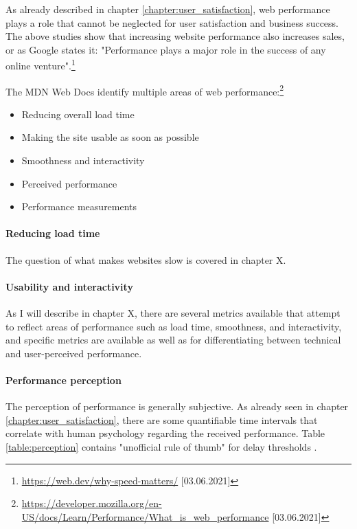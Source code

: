 As already described in chapter \ref{chapter:user_satisfaction}, web performance plays a role that cannot be neglected for user satisfaction and business success.
The above studies show that increasing website performance also increases sales, or as Google states it: "Performance plays a major role in the success of any online venture".\footnote{\url{https://web.dev/why-speed-matters/} [03.06.2021]}

The MDN Web Docs identify multiple areas of web performance:\footnote{\url{https://developer.mozilla.org/en-US/docs/Learn/Performance/What_is_web_performance} [03.06.2021]}
\begin{itemize}
\item Reducing overall load time
\item Making the site usable as soon as possible
\item Smoothness and interactivity
\item Perceived performance
\item Performance measurements
\end{itemize}

\paragraph{Reducing load time}

The question of what makes websites slow is covered in chapter X.


\paragraph{Usability and interactivity}

As I will describe in chapter X, there are several metrics available that attempt to reflect areas of performance such as load time, smoothness, and interactivity, and specific metrics are available as well as for differentiating between technical and user-perceived performance.


\paragraph{Performance perception}

The perception of performance is generally subjective.
As already seen in chapter \ref{chapter:user_satisfaction}, there are some quantifiable time intervals that correlate with human psychology regarding the received performance.
Table \ref{table:perception} contains "unofficial rule of thumb" for delay thresholds \cite{2013Grigorik}.


